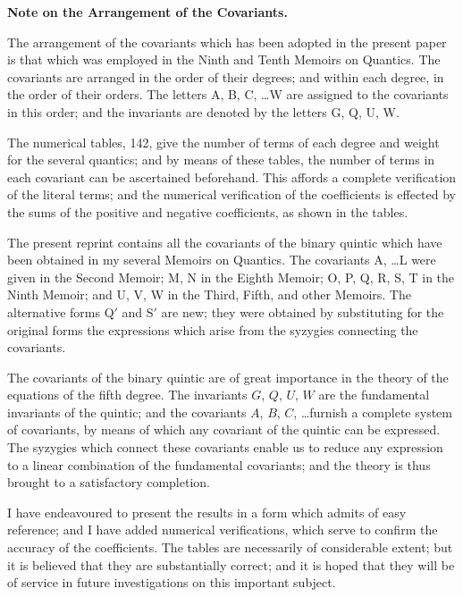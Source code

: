 \documentclass[11pt,a4paper]{book}
\begin{document}
\clearpage
\setcounter{page}{300}

\begin{center}
\textbf{Note on the Arrangement of the Covariants.}
\end{center}

The arrangement of the covariants which has been adopted in the present paper is that which was employed in the Ninth and Tenth Memoirs on Quantics. The covariants are arranged in the order of their degrees; and within each degree, in the order of their orders. The letters A, B, C, \ldots W are assigned to the covariants in this order; and the invariants are denoted by the letters G, Q, U, W.

The numerical tables, 142, give the number of terms of each degree and weight for the several quantics; and by means of these tables, the number of terms in each covariant can be ascertained beforehand. This affords a complete verification of the literal terms; and the numerical verification of the coefficients is effected by the sums of the positive and negative coefficients, as shown in the tables.

The present reprint contains all the covariants of the binary quintic which have been obtained in my several Memoirs on Quantics. The covariants A, \ldots L were given in the Second Memoir; M, N in the Eighth Memoir; O, P, Q, R, S, T in the Ninth Memoir; and U, V, W in the Third, Fifth, and other Memoirs. The alternative forms Q$'$ and S$'$ are new; they were obtained by substituting for the original forms the expressions which arise from the syzygies connecting the covariants.

\clearpage
\setcounter{page}{301}

The covariants of the binary quintic are of great importance in the theory of the equations of the fifth degree. The invariants $G$, $Q$, $U$, $W$ are the fundamental invariants of the quintic; and the covariants $A$, $B$, $C$, \ldots furnish a complete system of covariants, by means of which any covariant of the quintic can be expressed. The syzygies which connect these covariants enable us to reduce any expression to a linear combination of the fundamental covariants; and the theory is thus brought to a satisfactory completion.

I have endeavoured to present the results in a form which admits of easy reference; and I have added numerical verifications, which serve to confirm the accuracy of the coefficients. The tables are necessarily of considerable extent; but it is believed that they are substantially correct; and it is hoped that they will be of service in future investigations on this important subject.
\end{document}
